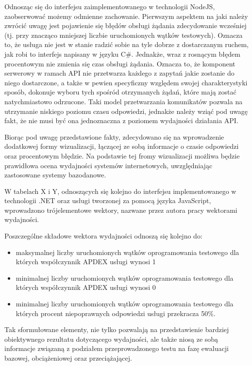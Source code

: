 Odnosząc się do interfejsu zaimplementowanego w technologii NodeJS, zaobserwować możemy odmienne zachowanie. Pierwszym aspektem na jaki należy zwrócić uwagę jest pojawienie się błędów obsługi żądania zdecydowanie wcześniej (tj. przy znacząco mniejszej liczbie uruchomionych wątków testowych). Oznacza to, że usługa nie jest w stanie radzić sobie na tyle dobrze z dostarczanym ruchem, jak robi to interfejs napisany w języku C\#. Jednakże, wraz z rosnącym błędem procentowym nie zmienia się czas obsługi żądania. Oznacza to, że komponent serwerowy w ramach API nie przetwarza każdego z zapytań jakie zostanie do niego dostarczone, a także w pewien specyficzny względem swojej charakterystyki sposób, dokonuje wyboru tych spośród otrzymanych żądań, które mają zostać natychmiastowo odrzucone. Taki model przetwarzania komunikatów pozwala na utrzymanie niskiego poziomu czasu odpowiedzi, jednakże należy wziąć pod uwagę fakt, że nie musi być ona jednoznaczna z poziomem wydajności działania API.

Biorąc pod uwagę przedstawione fakty, zdecydowano się na wprowadzenie dodatkowej formy wizualizacji, łączącej ze sobą informacje o czasie odpowiedzi oraz procentowym błędzie. Na podstawie tej fromy wizualizacji możliwa będzie prawidłowa ocena wydajności systemów internetowych, uwzględniając zastosowane systemy bazodanowe.

W tabelach X i Y, odnoszących się kolejno do interfejsu implementowanego w technologii .NET oraz usługi tworzonej za pomocą języka JavaScript, wprowadzono trójelementowe wektory, nazwane przez autora pracy wektorami wydajności.

Poszczególne składowe wektora wydajności odnoszą się kolejno do:
\begin{itemize}
    \item maksymalnej liczby uruchomionych wątków oprogramowania testowego dla których współczynnik APDEX usługi wynosi 1
    \item minimalnej liczby uruchomionych wątków oprogramowania testowego dla których współczynnik APDEX usługi wynosi 0
    \item minimalnej liczby uruchomionych wątków oprogramowania testowego dla których procent niepoprawnych odpowiedzi usługi przekracza 50\%.
\end{itemize}

Tak sformułowane elementy, nie tylko pozwalają na przedstawienie bardziej obiektywnego rezultatu dotyczącego wydajności, ale także niosą ze sobą informacje związaną z podziałem przeprowadzonego testu na fazę ewaluacji bazowej, obciążeniowej oraz przeciążającej.

